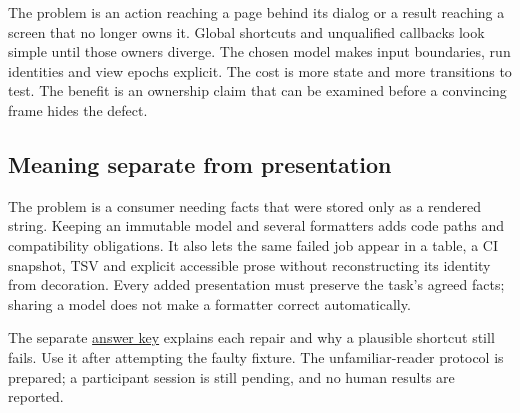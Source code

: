 The problem is an action reaching a page behind its dialog or a result reaching a screen that no longer owns it. Global shortcuts and unqualified callbacks look simple until those owners diverge. The chosen model makes input boundaries, run identities and view epochs explicit. The cost is more state and more transitions to test. The benefit is an ownership claim that can be examined before a convincing frame hides the defect.

\subsection{Meaning separate from presentation}

The problem is a consumer needing facts that were stored only as a rendered string. Keeping an immutable model and several formatters adds code paths and compatibility obligations. It also lets the same failed job appear in a table, a CI snapshot, TSV and explicit accessible prose without reconstructing its identity from decoration. Every added presentation must preserve the task's agreed facts; sharing a model does not make a formatter correct automatically.

The separate \hyperref[exercise-answers]{answer key} explains each repair and why a plausible shortcut still fails. Use it after attempting the faulty fixture. The unfamiliar-reader protocol is prepared; a participant session is still pending, and no human results are reported.
